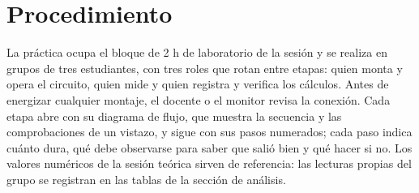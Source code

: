 \documentclass[12pt]{article}
\begin{document}
\section{Procedimiento}\label{sec:procedimiento}
La práctica ocupa el bloque de 2 h de laboratorio de la sesión y se realiza en grupos de tres estudiantes, con tres roles que rotan entre etapas: quien monta y opera el circuito, quien mide y quien registra y verifica los cálculos. Antes de energizar cualquier montaje, el docente o el monitor revisa la conexión. Cada etapa abre con su diagrama de flujo, que muestra la secuencia y las comprobaciones de un vistazo, y sigue con sus pasos numerados; cada paso indica cuánto dura, qué debe observarse para saber que salió bien y qué hacer si no. Los valores numéricos de la sesión teórica sirven de referencia: las lecturas propias del grupo se registran en las tablas de la sección de análisis.
\lineablanco
\end{document}
